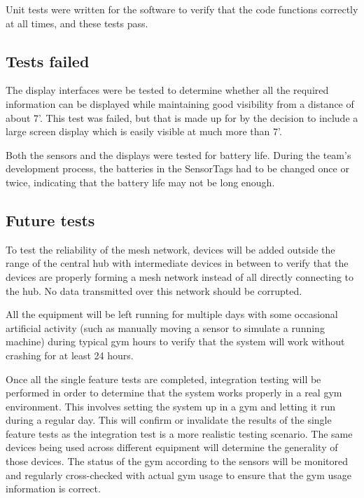 \documentclass[PPFS.tex]{template/subfiles}
\begin{document}
Unit tests were written for the software to verify that the code functions correctly at all times, and these tests pass.

\subsection{Tests failed}

The display interfaces were be tested to determine whether all the required information can be displayed while maintaining good visibility from a distance of about 7'. This test was failed, but that is made up for by the decision to include a large screen display which is easily visible at much more than 7'.

Both the sensors and the displays were tested for battery life. During the team's development process, the batteries in the SensorTags had to be changed once or twice, indicating that the battery life may not be long enough.

\subsection{Future tests}

To test the reliability of the mesh network, devices will be added outside the range of the central hub with intermediate devices in between to verify that the devices are properly forming a mesh network instead of all directly connecting to the hub. No data transmitted over this network should be corrupted.

All the equipment will be left running for multiple days with some occasional artificial activity (such as manually moving a sensor to simulate a running machine) during typical gym hours to verify that the system will work without crashing for at least 24 hours.

Once all the single feature tests are completed, integration testing will be performed in order to determine that the system works properly in a real gym environment. This involves setting the system up in a gym and letting it run during a regular day. This will confirm or invalidate the results of the single feature tests as the integration test is a more realistic testing scenario. The same devices being used across different equipment will determine the generality of those devices. The status of the gym according to the sensors will be monitored and regularly cross-checked with actual gym usage to ensure that the gym usage information is correct.
\end{document}
